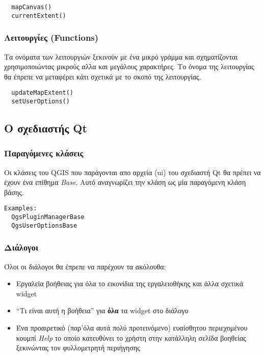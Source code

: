 \begin{verbatim}
  mapCanvas()
  currentExtent()
\end{verbatim}

\hypertarget{toc6}{}
\subsubsection{Λειτουργίες (Functions)}
Τα ονόματα των λειτουργιών ξεκινούν με ένα μικρό γράμμα και σχηματίζονται χρησιμοποιώντας μικρούς αλλα και μεγάλους χαρακτήρες. Το όνομα της λειτουργίας θα έπρεπε να μεταφέρει κάτι σχετικά με το σκοπό της λειτουργίας.

\begin{verbatim}
  updateMapExtent()
  setUserOptions()
\end{verbatim}

\hypertarget{toc7}{}
\subsection{Ο σχεδιαστής Qt}
\hypertarget{toc8}{}
\subsubsection{Παραγόμενες  κλάσεις}
Οι κλάσεις του QGIS που παράγονται απο αρχεία (ui) του σχεδιαστή Qt θα πρέπει να έχουν ένα επίθημα
\textit{Base}. Αυτό αναγνωρίζει την κλάση ως μία παραγόμενη κλάση βάσης.

\begin{verbatim}
Examples:
  QgsPluginManagerBase
  QgsUserOptionsBase
\end{verbatim}
\hypertarget{toc9}{}
\subsubsection{Διάλογοι}

Όλοι οι διάλογοι θα έπρεπε να παρέχουν τα ακόλουθα:

\begin{itemize}
\item Εργαλεία βοήθειας για όλα το εικονίδια της εργαλειοθήκης και άλλα σχετικά widget
\item “Τι είναι αυτή η βοήθεια” για \textbf{όλα} τα widget στο διάλογο
\item Ένα προαιρετικό (παρ'όλα αυτά πολύ προτεινόμενο) ευαίσθητου περιεχομένου κουμπί \textit{Help} το οποίο κατευθύνει το χρήστη στην κατάλληλη σελίδα βοηθείας ξεκινώντας τον φυλλομετρητή περιήγησης
\end{itemize}

